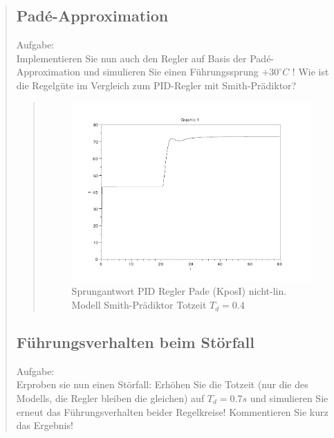 \begin{quote}
\begin{quote}
    \end{quote}
    
    
    \subsection{Pad\'e-Approximation}
    Aufgabe:\\
    Implementieren Sie nun auch den Regler auf Basis der Pad\'e-Approximation und simulieren Sie einen Führungssprung
    $+30^{\circ} C$ ! Wie ist die Regelgüte im Vergleich zum PID-Regler mit Smith-Prädiktor?\vspace{1em}

    \begin{quote}
        \begin{figure}[H]
        \centering
            \includegraphics[scale=0.7, trim = 0cm 0cm 0cm 0cm, clip]{./Bilder/4_4_Td_04}
                \caption{Sprungantwort PID Regler Pade (KposI) nicht-lin. Modell Smith-Prädiktor Totzeit $T_d = 0.4$}
        \end{figure}
        
    \end{quote}
    
    
    \subsection{Führungsverhalten beim Störfall}
    Aufgabe:\\
    Erproben sie nun einen Störfall: Erhöhen Sie die Totzeit (nur die des Modells, die Regler bleiben die gleichen)
    auf $T_d = 0.7s$ und simulieren Sie erneut das Führungsverhalten beider Regelkreise! Kommentieren Sie kurz das
    Ergebnis!\vspace{1em}
    

\end{quote}
